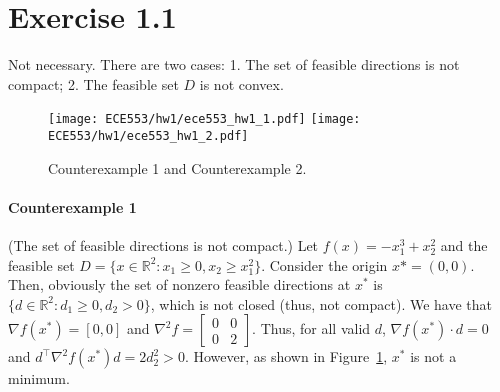 \documentclass[11pt]{report}
\newcommand{\T}{\intercal}
\begin{document}

\section*{Exercise 1.1}
Not necessary. There are two cases: 1. The set of feasible directions is not compact; 2. The feasible set $D$ is not convex.
\begin{figure}
    \centering
    \texttt{[image: ECE553/hw1/ece553\_hw1\_1.pdf]}
    \texttt{[image: ECE553/hw1/ece553\_hw1\_2.pdf]}
    \caption{Counterexample 1 and Counterexample 2.}
    \label{fig:fig1}
\end{figure}
\paragraph{Counterexample 1} (The set of feasible directions is not compact.) Let $f(x) = -x_1^3 + x_2^2$ and the feasible set $D = \{x \in \mathbb{R}^2: x_1 \geq 0, x_2 \geq x_1^2\}$. Consider the origin $x* = (0, 0)$. Then, obviously the set of nonzero feasible directions at $x^*$ is $\{d\in\mathbb{R}^2: d_1 \geq 0, d_2 > 0\}$, which is not closed (thus, not compact). We have that $\nabla f(x^*) = [0, 0]$ and $\nabla^2 f = \begin{bmatrix}0 & 0\\0 & 2\end{bmatrix}$. Thus, for all valid $d$, $\nabla f(x^*) \cdot d = 0$ and $d^\T \nabla^2 f(x^*) d = 2 d_2^2 > 0$. However, as shown in Figure~\ref{fig:fig1}, $x^*$ is not a minimum.
\end{document}
